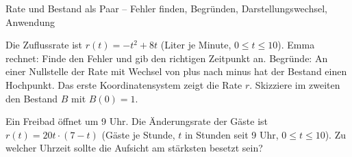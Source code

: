 \begin{aufgabe}{Rate und Bestand als Paar – Fehler finden, Begründen, Darstellungswechsel, Anwendung}
\begin{teile}
\teil Die Zuflussrate ist $r(t) = -t^2 + 8t$ (Liter je Minute, $0 \le t \le 10$). Emma rechnet:  Finde den Fehler und gib den richtigen Zeitpunkt an.
\teil Begründe: An einer Nullstelle der Rate mit Wechsel von plus nach minus hat der Bestand einen Hochpunkt.
\teil Das erste Koordinatensystem zeigt die Rate $r$. Skizziere im zweiten den Bestand $B$ mit $B(0) = 1$.

\begin{ksys}[xmin=0,xmax=7,ymin=-2,ymax=3,xlabel=t,ylabel=r]  \end{ksys} \begin{ksys}[xmin=0,xmax=7,ymin=0,ymax=6,xlabel=t,ylabel=B] \end{ksys}
\teil Ein Freibad öffnet um 9 Uhr. Die Änderungsrate der Gäste ist $r(t) = 20t \cdot (7 - t)$ (Gäste je Stunde, $t$ in Stunden seit 9 Uhr, $0 \le t \le 10$). Zu welcher Uhrzeit sollte die Aufsicht am stärksten besetzt sein?
\end{teile}
\end{aufgabe}
